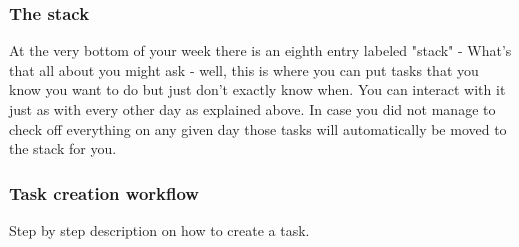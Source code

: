 \subsubsection{The stack} 
At the very bottom of your week there is an eighth entry labeled "stack" - What's that all about you might ask - well, this is where you can put tasks that you know you want to do but just don't exactly know when.  You can interact with it just as with every other day as explained above.  
In case you did not manage to check off everything on any given day those tasks will automatically be moved to the stack for you.

\subsubsection{Task creation workflow}
Step by step description on how to create a task. 

